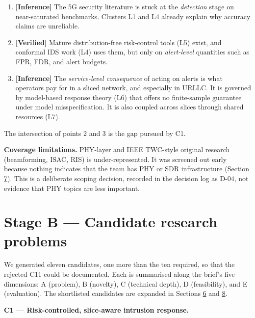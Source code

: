\begin{enumerate}
\def\labelenumi{\arabic{enumi}.}
\tightlist
\item
  \textbf{{[}Inference{]}} The 5G security literature is stuck at the
  \emph{detection} stage on near-saturated benchmarks. Clusters L1 and
  L4 already explain why accuracy claims are unreliable.
\item
  \textbf{{[}Verified{]}} Mature distribution-free risk-control tools
  (L5) exist, and conformal IDS work (L4) uses them, but only on
  \emph{alert-level} quantities such as FPR, FDR, and alert budgets.
\item
  \textbf{{[}Inference{]}} The \emph{service-level consequence} of
  acting on alerts is what operators pay for in a sliced network, and
  especially in URLLC. It is governed by model-based response theory
  (L6) that offers no finite-sample guarantee under model
  misspecification. It is also coupled across slices through shared
  resources (L7).
\end{enumerate}

The intersection of points 2 and 3 is the gap pursued by C1.

\textbf{Coverage limitations.} PHY-layer and IEEE TWC-style original
research (beamforming, ISAC, RIS) is under-represented. It was screened
out early because nothing indicates that the team has PHY or SDR
infrastructure (Section \protect\hyperlink{sec:feas}{7}). This is a
deliberate scoping decision, recorded in the decision log as D-04, not
evidence that PHY topics are less important.

\hypertarget{sec:candidates}{%
\section{Stage B --- Candidate research problems}\label{sec:candidates}}

We generated eleven candidates, one more than the ten required, so that
the rejected C11 could be documented. Each is summarised along the
brief's five dimensions: A (problem), B (novelty), C (technical depth),
D (feasibility), and E (evaluation). The shortlisted candidates are
expanded in Sections \protect\hyperlink{sec:audit}{6} and
\protect\hyperlink{sec:rec}{8}.

\textbf{C1 --- Risk-controlled, slice-aware intrusion response.}

